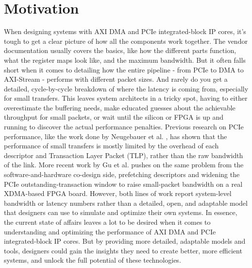 
\section{Motivation}
\label{sec:ch1_motivation}


When designing systems with AXI DMA and PCIe integrated-block IP cores, it's tough to get a clear picture of how all the components work together. The vendor documentation usually covers the basics, like how the different parts function, what the register maps look like, and the maximum bandwidth. But it often falls short when it comes to detailing how the entire pipeline - from PCIe to DMA to AXI-Stream - performs with different packet sizes. And rarely do you get a detailed, cycle-by-cycle breakdown of where the latency is coming from, especially for small transfers. This leaves system architects in a tricky spot, having to either overestimate the buffering needs, make educated guesses about the achievable throughput for small packets, or wait until the silicon or FPGA is up and running to discover the actual performance penalties. Previous research on PCIe performance, like the work done by Neugebauer et al. \cite{neugebauer2018pcie}, has shown that the performance of small transfers is mostly limited by the overhead of each descriptor and Transaction Layer Packet (TLP), rather than the raw bandwidth of the link. More recent work by Gu et al. \cite{gu2025cooptimization} pushes on the same problem from the software-and-hardware co-design side, prefetching descriptors and widening the PCIe outstanding-transaction window to raise small-packet bandwidth on a real XDMA-based FPGA board. However, both lines of work report system-level bandwidth or latency numbers rather than a detailed, open, and adaptable model that designers can use to simulate and optimize their own systems. In essence, the current state of affairs leaves a lot to be desired when it comes to understanding and optimizing the performance of AXI DMA and PCIe integrated-block IP cores. But by providing more detailed, adaptable models and tools, designers could gain the insights they need to create better, more efficient systems, and unlock the full potential of these technologies.


